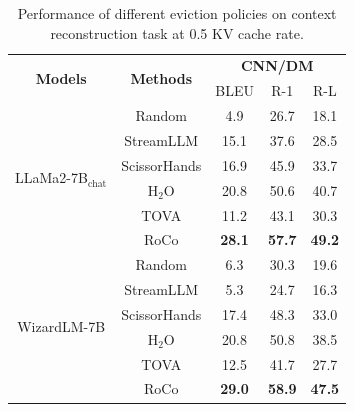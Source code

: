\begin{table}[t]
    \centering
    \small
    \begin{tabular}{cc|ccc}
    \toprule
    \multirow{2}{*}{\textbf{Models}}    & \multirow{2}{*}{\textbf{Methods}} & \multicolumn{3}{c}{\textbf{CNN/DM}} \\
                               &                          & BLEU   & R-1  & R-L  \\
    \midrule
    \multirow{6}{*}{LLaMa2-7B$_{\text{chat}}$} & Random                   &4.9             &26.7      &18.1      \\
                               & StreamLLM                &15.1             &37.6      &28.5      \\
                               & ScissorHands             &16.9             &45.9      &33.7      \\
                               & H$_{\text{2}}$O                      &20.8             &50.6      &40.7      \\
                               & TOVA                     &11.2             & 43.1     &30.3      \\
                               & RoCo                     & \textbf{28.1}            &\textbf{57.7}      &\textbf{49.2}      \\
    \midrule
    \multirow{6}{*}{WizardLM-7B} & Random                   &6.3             &30.3      &19.6      \\
                               & StreamLLM                &5.3             &24.7      &16.3      \\
                               & ScissorHands             &17.4             &48.3      &33.0      \\
                               & H$_{\text{2}}$O                      &20.8             &50.8      &38.5      \\
                               & TOVA                     &12.5             &41.7      &27.7      \\
                               & RoCo                     &\textbf{29.0}             &\textbf{58.9}      &\textbf{47.5}      \\
    \bottomrule
    \end{tabular}
    \caption{Performance of different eviction policies on context reconstruction task at 0.5 KV cache rate.}
    \label{table:rec}
\end{table}
